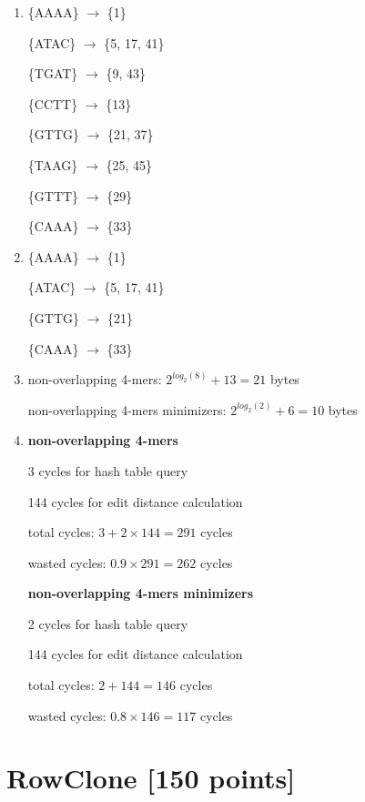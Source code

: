 \documentclass[a4paper]{article}
\begin{document}
\begin{enumerate}[label=\alph*)]
    \item \{AAAA\} $\rightarrow$ \{1\} 

          \{ATAC\} $\rightarrow$ \{5, 17, 41\}

          \{TGAT\} $\rightarrow$ \{9, 43\}

          \{CCTT\} $\rightarrow$ \{13\}

          \{GTTG\} $\rightarrow$ \{21, 37\}

          \{TAAG\} $\rightarrow$ \{25, 45\}

          \{GTTT\} $\rightarrow$ \{29\}
          
          \{CAAA\} $\rightarrow$ \{33\}

    \item \{AAAA\} $\rightarrow$ \{1\}

          \{ATAC\} $\rightarrow$ \{5, 17, 41\}

          \{GTTG\} $\rightarrow$ \{21\}

          \{CAAA\} $\rightarrow$ \{33\}

      \item non-overlapping 4-mers: $2^{log_2(8)} + 13 = 21$ bytes

            non-overlapping 4-mers minimizers: $2^{log_2(2)} + 6 = 10$ bytes

      \item \textbf{non-overlapping 4-mers}

            3 cycles for hash table query

            144 cycles for edit distance calculation

            total cycles: $3 + 2 \times 144 = 291$ cycles

            wasted cycles: $0.9 \times 291 = 262$ cycles

            \textbf{non-overlapping 4-mers minimizers}

            2 cycles for hash table query

            144 cycles for edit distance calculation

            total cycles: $2 + 144 = 146$ cycles

            wasted cycles: $0.8 \times 146 = 117$ cycles
\end{enumerate}

\section{RowClone [150 points]}
\end{document}
